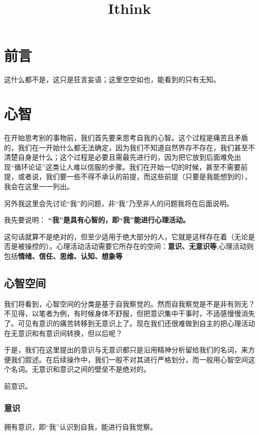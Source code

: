 \documentclass[fontset=windows, 12pt, a4paper]{article}
\date{}
\title{Ithink}
\begin{document}
\maketitle

\section*{前言}
这什么都不是，这只是狂言妄语；这里空空如也，能看到的只有无知。


\section{心智}

在开始思考别的事物前，我们首先要来思考自我的心智。这个过程是痛苦且矛盾的，我们在一开始什么都无法确定，因为我们不知道自然界存不存在，我们甚至不清楚自身是什么；这个过程是必要且需最先进行的，因为把它放到后面难免出现“循环论证”这类让人难以信服的步骤。我们在开始一切的时候，甚至不需要前提，或者说，我们要一些不得不承认的前提，而这些前提（只要是我能想到的），我会在这里一一列出。

另外我这里会先讨论“我”的问题，非“我”乃至非人的问题我将在后面说明。

我先要说明：
\textbf{“我”是具有心智的，即“我”能进行心理活动。}

这句话就算不是绝对的，但至少适用于绝大部分的人，它就是这样存在着（无论是否是被操控的）。心理活动活动需要它所存在的空间：\textbf{意识、无意识等};心理活动则包括\textbf{情绪、信任、思维、认知、想象等}

\subsection{心智空间}
我们将看到，心智空间的分类是基于自我察觉的。然而自我察觉是不是非有则无？不见得，以笔者为例，有时候身体不舒服，但把意识集中干事时，不适感慢慢消失了。可见有意识的痛苦转移到无意识上了。现在我们还很难做到自主的把心理活动在无意识和有意识间转换，但以后呢？

于是，我们在这里提出的意识与无意识都只是沿用精神分析留给我们的名词，来方便我们叙述。在后续操作中，我们一般不对其进行严格划分，而一般用心智空间这个名词。无意识和意识之间的壁垒不是绝对的。

前意识。

\subsubsection{意识}
拥有意识，即“我”认识到自我，能进行自我觉察。
\end{document}
